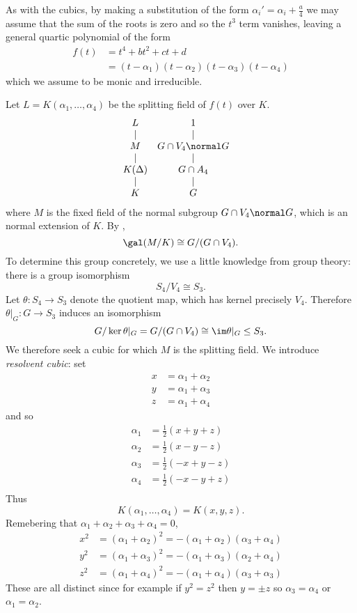 \documentclass[a4paper]{article}
\begin{document}
As with the cubics, by making a substitution of the form \(\alpha_i' = \alpha_i + \frac{a}{4}\) we may assume that the sum of the roots is zero and so the \(t^3\) term vanishes, leaving a general quartic polynomial of the form
\begin{align*}
  f(t) &= t^4 + bt^2 + ct + d \\
       &= (t - \alpha_1)(t - \alpha_2)(t - \alpha_3)(t - \alpha_4)
\end{align*}
which we assume to be monic and irreducible.

Let \(L = K(\alpha_1, \dots, \alpha_4)\) be the splitting field of \(f(t)\) over \(K\).
\[
  \begin{array}[h]{ccc}
    L & 1 & \\
    | & | & \\
    M & G \cap V_4 \normal G & \\
    | & | & \\
    K(\Delta) & G \cap A_4 & \\
    | & | & \\
    K & G &
  \end{array}
\]
where \(M\) is the fixed field of the normal subgroup \(G \cap V_4 \normal G\), which is an normal extension of \(K\). By ,
\[
  \gal(M/K) \cong G/(G \cap V_4).
\]
To determine this group concretely, we use a little knowledge from group theory: there is a group isomorphism
\[
  S_4/V_4 \cong S_3.
\]
Let \(\theta: S_4 \to S_3\) denote the quotient map, which has kernel precisely \(V_4\). Therefore \(\theta|_G: G \to S_3\) induces an isomorphism
\[
  G/\ker \theta|_G = G/(G \cap V_4) \cong \im \theta|_G \leq S_3.
\]
We therefore seek a cubic for which \(M\) is the splitting field. We introduce \emph{resolvent cubic}: set
\begin{align*}
  x &= \alpha_1 + \alpha_2 \\
  y &= \alpha_1 + \alpha_3 \\
  z &= \alpha_1 + \alpha_4
\end{align*}
and so
\begin{align*}
  \alpha_1 &= \frac{1}{2}(x + y + z) \\
  \alpha_2 &= \frac{1}{2}(x - y - z) \\
  \alpha_3 &= \frac{1}{2}(-x + y - z) \\
  \alpha_4 &= \frac{1}{2}(-x - y + z) \\
\end{align*}
Thus
\[
  K(\alpha_1, \dots, \alpha_4) = K(x, y, z).
\]
Remebering that \(\alpha_1 + \alpha_2 + \alpha_3 + \alpha_4 = 0\),
\begin{align*}
  x^2 &= (\alpha_1 + \alpha_2)^2 = -(\alpha_1 + \alpha_2)(\alpha_3 + \alpha_4) \\
  y^2 &= (\alpha_1 + \alpha_3)^2 = -(\alpha_1 + \alpha_3)(\alpha_2 + \alpha_4) \\
  z^2 &= (\alpha_1 + \alpha_4)^2 = -(\alpha_1 + \alpha_4)(\alpha_3 + \alpha_3)
\end{align*}
These are all distinct since for example if \(y^2 = z^2\) then \(y = \pm z\) so \(\alpha_3 = \alpha_4\) or \(\alpha_1 = \alpha_2\).
\end{document}
